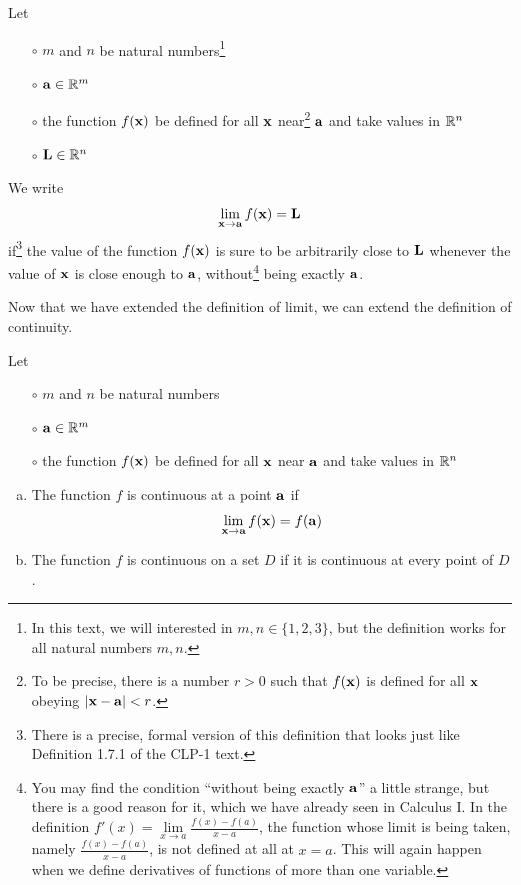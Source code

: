 \begin{defn}[Limit]\label{def limit}
Let 
\begin{itemize}\itemsep1pt \parskip0pt 
\item[$\circ$]
$m$ and $n$ be natural numbers\footnote{In this text, we will interested in
$m,n\in\big\{1,2,3\big\}$, but the definition works for all natural
numbers $m,n$.}
\item[$\circ$]
$\mathbf{a}\in \mathbb{R}^m$
\item[$\circ$] 
the function $f(\mathbf{x})$ be defined for all $\mathbf{x}$ near\footnote{To be precise, there is a number $r>0$ such that $f(\mathbf{x})$ is defined for all $\mathbf{x}$ obeying
$|\mathbf{x}-\mathbf{a}|<r$.} $\mathbf{a}$ and take values in $\mathbb{R}^n$
\item[$\circ$]
$\mathbf{L}\in\mathbb{R}^n$
\end{itemize}
  We write
\begin{align*}
  \lim_{\mathbf{x}\to \mathbf{a}} f(\mathbf{x}) = \mathbf{L}
\end{align*}
if\footnote{There is a precise, formal version of this definition that looks just like Definition 1.7.1 of the CLP-1 text.} the value of the function $f(\mathbf{x})$ is sure to be arbitrarily close 
to $\mathbf{L}$ whenever the value of $\mathbf{x}$ is close enough to $\mathbf{a}$, 
without\footnote{You may find the condition ``without  being exactly $\mathbf{a}$'' 
a little strange, but there is a good reason for it, which we have already seen in Calculus I. In the definition 
  $f'(x) = \lim\limits_{x\rightarrow a}\frac{f(x)-f(a)}{x-a}$, 
the function whose limit is being taken, namely  $\frac{f(x)-f(a)}{x-a}$, 
is not defined at all at $x=a$. This will again happen when we define
derivatives of functions of more than one variable.} 
being exactly $\mathbf{a}$. 
\end{defn}\noindent
Now that we have extended the definition of limit, we can extend the definition 
of continuity.
\begin{defn}[Continuity]\label{def continuity}
Let 
\begin{itemize}\itemsep1pt \parskip0pt 
\item[$\circ$]
$m$ and $n$ be natural numbers
\item[$\circ$]
$\mathbf{a}\in \mathbb{R}^m$
\item[$\circ$] 
the function $f(\mathbf{x})$ be defined for all $\mathbf{x}$ near $\mathbf{a}$ and take values in $\mathbb{R}^n$
\end{itemize}
\begin{enumerate}[(a)]
\item
The function $f$ is continuous at a point $\mathbf{a}$ if
\begin{equation*}
\lim_{\mathbf{x}\to \mathbf{a}} f(\mathbf{x}) = f(\mathbf{a})
\end{equation*}
\item
The function $f$ is continuous on a set $D$ if it is continuous at
every point of $D$.
\end{enumerate} 
\end{defn}
